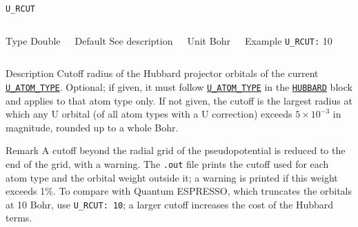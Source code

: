 \begin{frame}[allowframebreaks]{\texttt{U\_RCUT}} \label{U_RCUT}
\vspace*{-12pt}
\begin{columns}
\begin{block}{Type}
Double
\end{block}

\begin{block}{Default}
See description
\end{block}

\begin{block}{Unit}
Bohr
\end{block}

\begin{block}{Example}
\texttt{U\_RCUT:} 10 \\
\end{block}
\end{columns}

\begin{block}{Description}
Cutoff radius of the Hubbard projector orbitals of the current \hyperlink{U_ATOM_TYPE}{\texttt{U\_ATOM\_TYPE}}. Optional; if given, it must follow \hyperlink{U_ATOM_TYPE}{\texttt{U\_ATOM\_TYPE}} in the \hyperlink{HUBBARD}{\texttt{HUBBARD}} block and applies to that atom type only. If not given, the cutoff is the largest radius at which any U orbital (of all atom types with a U correction) exceeds $5 \times 10^{-3}$ in magnitude, rounded up to a whole Bohr.
\end{block}

\begin{block}{Remark}
A cutoff beyond the radial grid of the pseudopotential is reduced to the end of the grid, with a warning. The \texttt{.out} file prints the cutoff used for each atom type and the orbital weight outside it; a warning is printed if this weight exceeds 1\%. To compare with Quantum ESPRESSO, which truncates the orbitals at 10 Bohr, use \texttt{U\_RCUT: 10}; a larger cutoff increases the cost of the Hubbard terms.
\end{block}

\end{frame}
